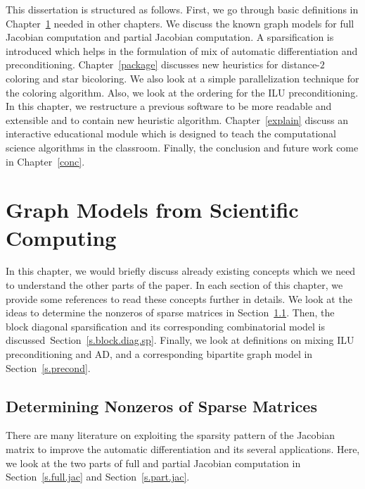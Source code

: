 \documentclass[12pt, twoside]{book}
\newcommand{\secref}[1]{Section~\protect\ref{#1}}
\newcommand{\chapref}[1]{Chapter~\protect\ref{#1}}
\begin{document}
This dissertation is structured as follows.
First, we go through basic definitions in \chapref{prel} needed in other chapters.
We discuss the known graph models for full Jacobian computation and partial Jacobian
computation. A sparsification is introduced which helps in the formulation of
mix of automatic differentiation and preconditioning.
\chapref{package} discusses new heuristics for distance-$2$ coloring and
star bicoloring. We also look at a simple parallelization technique for the
coloring algorithm. Also, we look at the ordering for the ILU preconditioning.
In this chapter, we restructure a previous software
to be more readable and extensible and to contain new heuristic algorithm.
\chapref{explain} discuss an interactive educational module
which is designed to teach the computational science algorithms in the classroom.
Finally, the conclusion and future work come in \chapref{conc}.

\chapter{Graph Models from Scientific Computing}
\label{prel}
In this chapter, we would briefly discuss already existing concepts which we need to understand
the other parts of the paper. In each section of this chapter,
we provide some references to read these concepts further in details.
We look at the ideas to determine the nonzeros of sparse matrices in
\secref{s.det.nonzero}. Then, the block diagonal sparsification
and its corresponding combinatorial model is discussed~\secref{s.block.diag.sp}.
Finally, we look at definitions on mixing ILU preconditioning and AD, and
a corresponding bipartite graph model in \secref{s.precond}.

\section{Determining Nonzeros of Sparse Matrices}
\label{s.det.nonzero}
There are many literature on exploiting the sparsity pattern of the Jacobian matrix
to improve the automatic differentiation and its several applications.
Here, we look at the two parts of full and partial Jacobian computation in
\secref{s.full.jac} and \secref{s.part.jac}.
\end{document}
